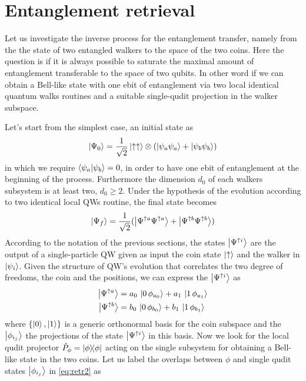 \documentclass[
	aps, pra,
	superscriptaddress, twocolumn,
	floatfix,
	10pt
]{revtex4-1}
\begin{document}
\section{Entanglement retrieval}
\label{sec:entanglement_retrieval}

Let us investigate the inverse process for the entanglement transfer, namely from the the state of two entangled walkers to the space of the two coins. Here the question is if it is always possible to saturate the maximal amount of entanglement transferable to the space of two qubits. In other word if we can obtain a Bell-like state with one ebit of entanglement via two local identical quantum walks routines and a suitable single-qudit projection in the walker subspace. 

Let's start from the simplest case, an initial state as
\begin{equation}
    \ket{\Psi_0}=\frac{1}{\sqrt{2}}\ket{\uparrow\uparrow}\otimes
    ( \ket{\psi_a\psi_a}+\ket{\psi_b\psi_b})
\end{equation}
in which we require $\braket{\psi_a}{\psi_b}=0$, in order to have one ebit of entanglement at the beginning of the process. Furthermore the dimension $d_0$ of each walkers subsystem is at least two, $d_0\geq 2$. Under the hypothesis of the evolution according to two identical local QWs routine, the final state becomes
\begin{equation}
    \ket{\Psi_f}=\frac{1}{\sqrt{2}}(\ket{\Psi^{\uparrow a}\Psi^{\uparrow a}}+\ket{\Psi^{\uparrow b}\Psi^{\uparrow b}})
    \label{eq:retr1}
\end{equation}
According to the notation of the previous sections, the states $\ket{\Psi^{\uparrow i}}$ are the output of a single-particle QW given as input the coin state $\ket{\uparrow}$ and the walker in $\ket{\psi_i}$. Given the structure of QW's evolution that correlates the two degree of freedoms, the coin and the positions, we can express the $\ket{\Psi^{\uparrow i}}$ as
\begin{align}
    \ket{\Psi^{\uparrow a}}&= a_0\,\ket{0\,\phi_{a_0}} +a_1\,\ket{1\,\phi_{a_1}} \notag\\
    \ket{\Psi^{\uparrow b}}&= b_0\,\ket{0\,\phi_{b_0}} +b_1\,\ket{1\,\phi_{b_1}}
    \label{eq:retr2}
\end{align}
where $\{\ket{0},\ket{1}\}$ is a generic orthonormal basis for the coin subspace and the $\ket{\phi_{i_j}}$ the projections of the state $\ket{\Psi^{\uparrow i}}$ in this basis. 
Now we look for the local qudit projector $\hat{P}_{\phi}=\ketbra{\phi}$ acting on the single subsystem for obtaining a Bell-like state in the two coins. Let us label the overlaps between $\phi$ and single qudit states $\ket{\phi_{i_j}}$ in \eqref{eq:retr2} as
\end{document}
